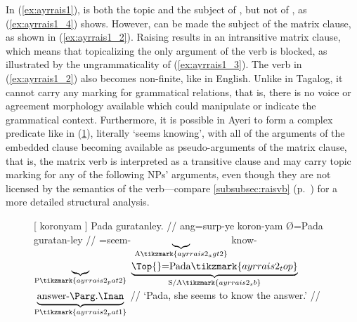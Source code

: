 In (\ref{ex:ayrrais1}),  is both the topic and the subject of
, but not of , as
(\ref{ex:ayrrais1_4}) shows. However,  can be made the subject
of the matrix clause, as shown in (\ref{ex:ayrrais1_2}). Raising results in an
intransitive matrix clause, which means that topicalizing the only argument of
the verb is blocked, as illustrated by the ungrammaticality of
(\ref{ex:ayrrais1_3}). The verb in (\ref{ex:ayrrais1_2}) also becomes
non-finite, like in English. Unlike in Tagalog, it cannot carry any marking for
grammatical relations, that is, there is no voice or agreement morphology
available which could manipulate or indicate the grammatical context.
Furthermore, it is possible in Ayeri to form a complex predicate like
 in (\ref{ex:ayrrais2}), literally
`seems knowing', with all of the arguments of the embedded clause becoming
available as pseudo-arguments of the matrix clause, that is, the matrix verb is
interpreted as a transitive clause and may carry topic marking for any of the
following NPs' arguments, even though they are not licensed by the semantics of
the verb---compare \autoref{subsubsec:raisvb} (p.~\pageref{subsubsec:raisvb})
for a more detailed structural analysis.

\begin{figure}
\ex\label{ex:ayrrais2}\begingl[aboveglcskip=1.5em, aboveglftskip=2.5em]
	 \textup{[} {} koronyam {} \textup{]} Pada
		guratanley. //
	\glb ang=surp-ye {} {} koron-yam {} {} Ø=Pada guratan-ley //
	\glc \Aarg{}=seem-\TsgF{}%
		{}
		$\underbrace{}_{\text{A}%
			\tikzmark{ayrrais2_agt2}%
		}$
		know-\Ptcp{}
		$\underbrace{}_{\text{P}%
			\tikzmark{ayrrais2_pat2}%
		}$
		{}
		$\underbrace{\text{\Top{}=Pada}%
			\tikzmark{ayrrais2_top}%
		}_{\text{S/A}%
			\tikzmark{ayrrais2_sb}%
		}$
		$\underbrace{\text{answer-\PargI{}}}_{\text{P}%
			\tikzmark{ayrrais2_pat1}%
		}$
		//
	\glft `Pada, she seems to know the answer.' //
\endgl
{}

\xe
\end{figure}

